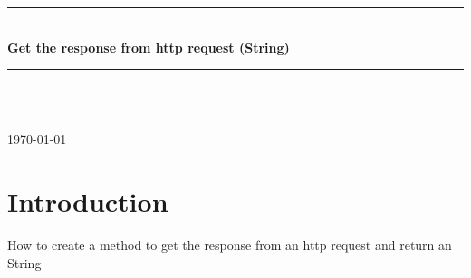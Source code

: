 \documentclass[12pt]{article} %
\begin{document}

\begin{titlepage}

\newcommand{\HRule}{\rule{\linewidth}{0.5mm}} %

\center %

\HRule \\[0.4cm]
{ \huge \bfseries Get the response from http request (String)}\\[0.4cm] %
\HRule \\[1.5cm]

\begin{minipage}{0.4\textwidth}
\end{minipage}\\[4cm]

{\large \today}\\[3cm] %


\vfill %

\end{titlepage}


\tableofcontents %

\newpage %


\section{Introduction} %

How to create a method to get the response from an http request and return an String
\end{document}

